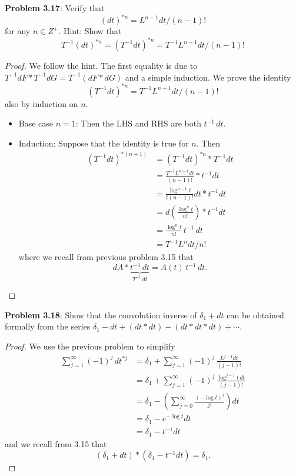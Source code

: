 \documentclass[12pt]{article}
\begin{document}
\fi

\textbf{Problem 3.17}: Verify that
$$(dt)^{*n} = L^{n-1} dt / (n-1)!$$
for any $n \in Z^+$. Hint: Show that
$$T^{-1} (dt)^{*n} = (T^{-1} dt)^{*n} = T^{-1} L^{n-1} dt / (n-1)!$$

\begin{proof}
We follow the hint. The first equality is due to $T^{-1} dF * T^{-1} dG = T^{-1} (dF * dG)$ and a simple induction. We prove the identity
$$(T^{-1} dt)^{*n} = T^{-1} L^{n-1} dt / (n-1)!$$
also by induction on $n$.
\begin{itemize}
\item Base case $n = 1$: Then the LHS and RHS are both $t^{-1} \, dt$.
\item Induction: Suppose that the identity is true for $n$. Then
\begin{align*}
(T^{-1} dt)^{*(n+1)} &= (T^{-1} dt)^{*n} * T^{-1} dt\\
&= \frac{T^{-1} L^{n-1} dt}{(n-1)!} * t^{-1} dt\\
&= \frac{\log^{n-1} t}{t (n-1)!} dt * t^{-1} dt\\
&= d \left( \frac{\log^n t}{n!} \right) * t^{-1} dt\\
&= \frac{\log^n t}{n!} \, t^{-1} \, dt\\
&= T^{-1} L^n dt / n!
\end{align*}
where we recall from previous problem 3.15 that
$$dA * \underbrace{t^{-1} \, dt}_{T^{-1} \, dt} = A(t) \, t^{-1} \, dt.$$
\end{itemize}
\end{proof}

\textbf{Problem 3.18}: Show that the convolution inverse of $\delta_1 + dt$ can be obtained formally from the series $\delta_1 - dt + (dt * dt) - (dt * dt * dt) + \cdots$.

\begin{proof}
We use the previous problem to simplify
\begin{align*}
\sum_{j = 1}^{\infty} (-1)^j \, dt^{*j} &= \delta_1 + \sum_{j = 1}^{\infty} (-1)^j \, \frac{L^{j-1} dt}{(j-1)!}\\
&= \delta_1 + \sum_{j = 1}^{\infty} (-1)^j \, \frac{\log^{j-1} t \, dt}{(j-1)!}\\
&= \delta_1 - \left( \sum_{j = 0}^{\infty} \frac{(- \log t)^j}{j!} \right) dt\\
&= \delta_1 - e^{- \log t} dt\\
&= \delta_1 - t^{-1} dt
\end{align*}
and we recall from 3.15 that
$$(\delta_1 + dt) * (\delta_1 - t^{-1} dt) = \delta_1.$$
\end{proof}
\end{document}
